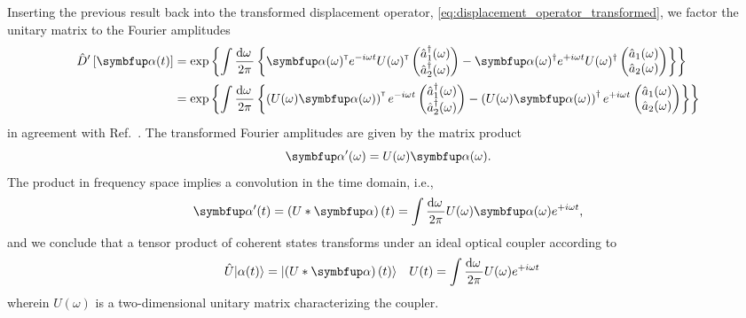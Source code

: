 Inserting the previous result back into the transformed displacement operator, \cref{eq:displacement_operator_transformed}, we factor the unitary matrix to the Fourier amplitudes
\begin{equation}
	\begin{split}
		\hat{D}^\prime\left[\vb{\alpha}(t)\right]
		&=
		\exp\left\{
			\int\frac{\dd{\omega}}{2\pi}
			\left\{
				\vb{\alpha}(\omega)^\trans
				e^{-i\omega t}
				U(\omega)^\trans
				\begin{pmatrix}
					\hat{a}_1^\dagger(\omega) \\
					\hat{a}_2^\dagger(\omega)
				\end{pmatrix}
				-
				\vb{\alpha}(\omega)^\dagger
				e^{+i\omega t}
				U(\omega)^\dagger
				\begin{pmatrix}
					\hat{a}_1(\omega) \\
					\hat{a}_2(\omega)
				\end{pmatrix}
			\right\}
		\right\}
		\\
		&=
		\exp\left\{
			\int\frac{\dd{\omega}}{2\pi}
			\left\{
				\left(
					U(\omega)
					\vb{\alpha}(\omega)
				\right)^\trans
				e^{-i\omega t}
				\begin{pmatrix}
					\hat{a}_1^\dagger(\omega) \\
					\hat{a}_2^\dagger(\omega)
				\end{pmatrix}
				-
				\left(
					U(\omega)
					\vb{\alpha}(\omega)
				\right)^\dagger
				e^{+i\omega t}
				\begin{pmatrix}
					\hat{a}_1(\omega) \\
					\hat{a}_2(\omega)
				\end{pmatrix}
			\right\}
		\right\}
	\end{split}
\end{equation}
in agreement with Ref.~\cite[p.~210]{Vogel2006}.
The transformed Fourier amplitudes are given by the matrix product
\begin{equation}
	\vb{\alpha}^\prime(\omega)
	=
	U(\omega)
	\vb{\alpha}(\omega)
	\label{eq:coupler_coherent_amplitudes_frequency}
	.
\end{equation}
The product in frequency space implies a convolution in the time domain, i.e.,
\begin{equation}
	\vb{\alpha}^\prime(t)
	=
	\left(U*\vb{\alpha}\right)(t)
	=
	\int\frac{\dd{\omega}}{2\pi}
	U(\omega)
	\vb{\alpha}(\omega)
	e^{+i\omega t}
	\label{eq:coupler_coherent_amplitudes_time}
	,
\end{equation}
and we conclude that a tensor product of coherent states transforms under an ideal optical coupler according to
\begin{align}
	\hat{U}
	\ket*{\alpha(t)}
	&=
	\ket*{\left(U*\vb{\alpha}\right)(t)}	
	&
	U(t)
	&=
	\int\frac{\dd{\omega}}{2\pi}
	U(\omega)
	e^{+i\omega t}
	\label{eq:coupler_coherent_state}
\end{align}
wherein $U(\omega)$ is a two-dimensional unitary matrix characterizing the coupler.

